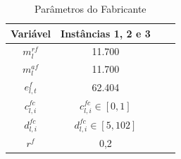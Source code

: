 \begin{table}[h!]
\centering
\caption{Parâmetros do Fabricante}
\label{tab:parametros_fabricante}
\begin{tabular}{|c|c|c|c|}
\hline
\textbf{Variável} & \textbf{Instâncias 1, 2 e 3} \\
\hline
$m^{rf}_{l}$ & 11.700 \\
\hline
$m^{af}_{l}$ & 11.700 \\
\hline
$e^{f}_{l,t}$ & 62.404 \\
\hline
$c^{fc}_{l,i}$ & $c^{fc}_{l,i} \in [0, 1]$ \\
\hline
$d^{fc}_{l,i}$ & $d^{fc}_{l,i} \in [5, 102]$ \\
\hline
$r^{f}$ & 0,2 \\
\hline
\end{tabular}
\end{table}
